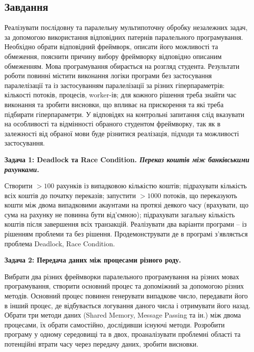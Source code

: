 \documentclass[14pt, a4paper]{extreport}
\begin{document}
	\subsection*{Завдання}
	
	Реалізувати послідовну та паралельну мультипоточну обробку незалежних задач, за допомогою використання відповідних патернів паралельного програмування. Необхідно обрати відповідний фреймворк, описати його можливості та обмеження, пояснити причину вибору фреймворку відповідно описаним обмеженням. Мова програмування обирається на розгляд студента. Результати роботи повинні містити виконання логіки програми без застосування паралелізації та із застосуванням паралелізації за різних гіперпараметрів: кількості потоків, процесів, worker-ів; для кожного рішення треба знайти час виконання та зробити висновки, що впливає на прискорення та які треба підбирати гіперпараметри. У відповідях на контрольні запитання слід вказувати на особливості та відмінності обраного студентом фреймворку, так як в залежності від обраної мови буде різнитися реалізація, підходи та можливості застосування.
	
	\textbf{Задача 1: Deadlock та Race Condition. \textit{Переказ коштів між банківськими рахунками}.}
	
	Створити $ > 100$ рахунків із випадковою кількістю коштів; підрахувати кількість всіх коштів до початку переказів; запустити $ > 1000$ потоків, що переказують кошти між двома випадковими акаунтами на протязі деякого часу (врахувати, що сума на рахунку не повинна бути від’ємною); підрахувати загальну кількість коштів після завершення всіх транзакцій. Реалізувати два варіанти програми -- із рішенням проблеми та без рішення. Продемонструвати де в програмі з’являється проблема Deadlock, Race Condition.
	
	\textbf{Задача 2: Передача даних між процесами різного роду.}
	
	Вибрати два різних фреймворки паралельного програмування на різних мовах програмування, створити основний процес та допоміжний за допомогою різних методів. Основний процес повинен генерувати випадкове число, передавати його в інший процес, де відбувається логування даного числа і отримувати його назад. Обрати три методи даних (Shared Memory, Message Passing та ін.) між двома процесами, їх обрати самостійно, дослідивши існуючі методи. Розробити програму у одному середовищі та в двох, проаналізувати проблемні області та потенційні втрати часу через передачу даних, зробити висновки.
	
	\pagebreak
	
\end{document}
